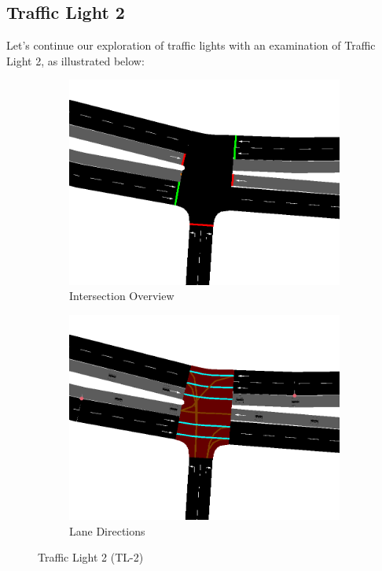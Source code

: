 \subsection{Traffic Light 2} \label{sec:tl-2}
Let's continue our exploration of traffic lights with an examination of Traffic Light 2, as illustrated below:

\begin{figure}[h]
    \centering
    \begin{subfigure}{0.45\textwidth}
        \centering
        \includegraphics[width=\linewidth]{images/methodology/tl-2-street.png}
        \caption{Intersection Overview}
    \end{subfigure}
    \hfill
    \begin{subfigure}{0.45\textwidth}
        \centering
        \includegraphics[width=\linewidth]{images/methodology/tl-2-directions.png}
        \caption{Lane Directions}
    \end{subfigure}
    \caption{Traffic Light 2 (TL-2)}
    \label{fig:tl-2}
\end{figure}

